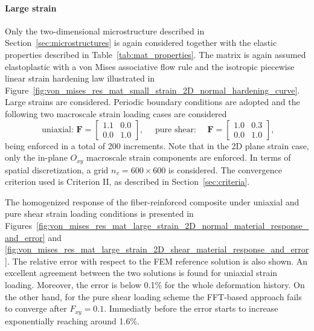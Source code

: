 \FloatBarrier

\paragraph{Large strain}

Only the two-dimensional microstructure described in Section~\ref{sec:microstructures} is again considered together with the elastic properties described in Table~\ref{tab:mat_properties}.
The matrix is again assumed elastoplastic with a von Mises associative flow rule and the isotropic piecewise linear strain hardening law illustrated in Figure~\ref{fig:von_mises_res_mat_small_strain_2D_normal_hardening_curve}.
Large strains are considered.
Periodic boundary conditions are adopted and the following two macroscale strain loading cases are considered
\begin{equation}
\text { uniaxial: } \bm{F}=\left[\begin{array}{cc}
1.1 & 0.0 \\
0.0 & 1.0
\end{array}\right], \quad \text { pure shear: } \quad \bm F=\left[\begin{array}{cc}
1.0 & 0.3 \\
0.0 & 1.0
\end{array}\right],
\end{equation}
being enforced in a total of 200 increments.
Note that in the 2D plane strain case, only the in-plane \(O_{x y}\) macroscale strain components are enforced.
In terms of spatial discretization, a grid \(n_{v}=600 \times 600\) is considered.
The convergence criterion used is Criterion II, as described in Section~\ref{sec:criteria}.

The homogenized response of the fiber-reinforced composite under uniaxial and pure shear strain loading conditions is presented in Figures~\ref{fig:von_mises_res_mat_large_strain_2D_normal_material_response_and_error} and \ref{fig:von_mises_res_mat_large_strain_2D_shear_material_response_and_error}.
The relative error with respect to the FEM reference solution is also shown.
An excellent agreement between the two solutions is found for uniaxial strain loading.
Moreover, the error is below 0.1\% for the whole deformation history.
On the other hand, for the pure shear loading scheme the FFT-based approach fails to converge after \(F_{xy}=0.1\).
Immediatly before the error starts to increase exponentially reaching around 1.6\%.

